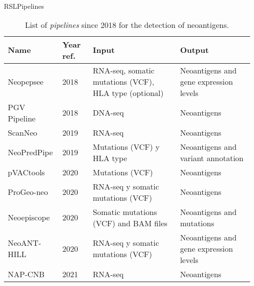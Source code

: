 \documentclass[10pt]{beamer}
\newcommand{\1}{
	\setbeamertemplate{background}{
		\texttt{[image: img/1]}
		\tikz[overlay] \fill[fill opacity=0.75,fill=white] (0,0) rectangle (-\paperwidth,\paperheight);
	}
}
\begin{document}
\begin{frame}{RSL}{Pipelines}
	
	\fontsize{7pt}{5pt}\selectfont
	
	\begin{table}[]
		\centering
		\caption{List of \textit{pipelines} since 2018 for the detection of neoantigens.}		
		\setlength{\tabcolsep}{0.5em} %
		{\renewcommand{\arraystretch}{2}%
			\begin{tabular}{lp{1.2cm}p{2.5cm}p{2.5cm}}
				\textbf{Name} & \textbf{Year ref.}                                  & \textbf{Input}                                         & \textbf{Output}                                     \\ \hline
				Neopepsee       & 2018 \cite{kim2018neopepsee}           & RNA-seq, somatic mutations (VCF), HLA type (optional) & Neoantigens and gene expression levels   \\ 
				PGV Pipeline    & 2018 \cite{rubinsteyn2018computational}& DNA-seq                                                  & Neoantigens                                       \\
				ScanNeo         & 2019 \cite{wang2019scanneo}            & RNA-seq                                                  & Neoantigens                                       \\
				NeoPredPipe     & 2019 \cite{schenck2019neopredpipe}     & Mutations (VCF) y HLA type                           & Neoantigens and variant annotation              \\
				pVACtools       & 2020 \cite{hundal2020pvactools}        & Mutations (VCF)                                         & Neoantigens                                       \\
				ProGeo-neo      & 2020 \cite{li2020progeo}               & RNA-seq y somatic mutations (VCF)                        & Neoantigens                                       \\
				Neoepiscope     & 2020 \cite{wood2020neoepiscope}        & Somatic mutations (VCF) and BAM files                  & Neoantigens and mutations                          \\
				NeoANT-HILL     & 2020 \cite{coelho2020neoant}           & RNA-seq y somatic mutations (VCF)                        & Neoantigens and gene expression levels \\
				NAP-CNB         & 2021 \cite{wert2021predicting}         & RNA-seq                                                  & Neoantigens                                       \\
				

\end{tabular}}
\end{table}
\end{frame}
\end{document}
